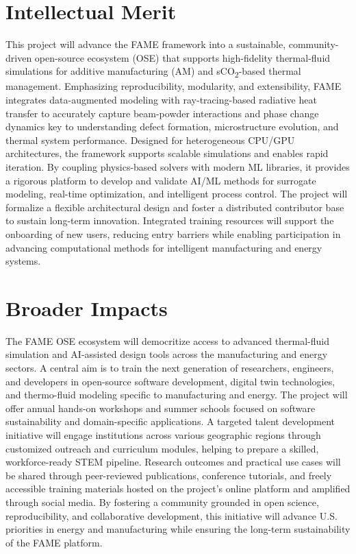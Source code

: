 \documentclass[11pt]{article}
\newcommand{\CO}[1]{CO\textsubscript{#1}}
\begin{document}
\section*{Intellectual Merit}
\vspace{-3pt}
\noindent
This project will advance the FAME framework into a sustainable, community-driven open-source ecosystem (OSE) that supports high-fidelity thermal-fluid simulations for additive manufacturing (AM) and s\CO{2}-based thermal management. Emphasizing reproducibility, modularity, and extensibility, FAME integrates data-augmented modeling with ray-tracing-based radiative heat transfer to accurately capture beam-powder interactions and phase change dynamics key to understanding defect formation, microstructure evolution, and thermal system performance. Designed for heterogeneous CPU/GPU architectures, the framework supports scalable simulations and enables rapid iteration. By coupling physics-based solvers with modern ML libraries, it provides a rigorous platform to develop and validate AI/ML methods for surrogate modeling, real-time optimization, and intelligent process control. The project will formalize a flexible architectural design and foster a distributed contributor base to sustain long-term innovation. Integrated training resources will support the onboarding of new users, reducing entry barriers while enabling participation in advancing computational methods for intelligent manufacturing and energy systems.
\vspace{-3pt}
\section*{Broader Impacts}
\vspace{-3pt}
\noindent
The FAME OSE ecosystem will democritize access to advanced thermal-fluid simulation and AI-assisted design tools across the manufacturing and energy sectors. A central aim is to train the next generation of researchers, engineers, and developers in open-source software development, digital twin technologies, and thermo-fluid modeling specific to manufacturing and energy. The project will offer annual hands-on workshops and summer schools focused on software sustainability and domain-specific applications. A targeted talent development initiative will engage institutions across various geographic regions through customized outreach and curriculum modules, helping to prepare a skilled, workforce-ready STEM pipeline. Research outcomes and practical use cases will be shared through peer-reviewed publications, conference tutorials, and freely accessible training materials hosted on the project's online platform and amplified through social media. By fostering a community grounded in open science, reproducibility, and collaborative development, this initiative will advance U.S. priorities in energy and manufacturing while ensuring the long-term sustainability of the FAME platform.
\end{document}
